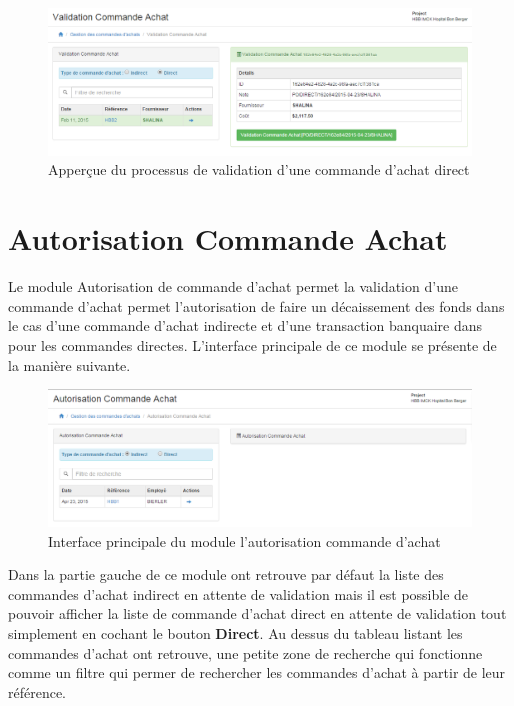 \documentclass[12pt,a4paper]{report}
\begin{document}
\begin{figure}[h]
\begin{center}
\includegraphics[width=12cm]{pic/ValidAchatDirect.png}
\end{center}
\caption{Apperçue du processus de validation d'une commande d'achat direct}
\label{Apperçue du processus de validation d'une commande d'achat direct}
\end{figure} 

\newpage
\newpage
\section{Autorisation Commande Achat}
Le module Autorisation de commande d'achat permet la validation d'une commande d'achat permet l'autorisation de faire un décaissement des fonds dans le cas d'une commande d'achat indirecte et d'une transaction banquaire dans pour les commandes directes. L'interface principale de ce module se présente de la manière suivante.

\begin{figure}[h]
\begin{center}
\includegraphics[width=12cm]{pic/AutorisAchat.png}
\end{center}
\caption{Interface principale du module l'autorisation commande d'achat}
\label{Interface principale du module l'autorisation commande d'achat}
\end{figure}  

Dans la partie gauche de ce module ont retrouve par défaut la liste des commandes d'achat indirect en attente de validation mais il est possible de pouvoir afficher la liste de commande d'achat direct en attente de validation tout simplement en cochant le bouton \textbf{Direct}. Au dessus du tableau listant les commandes d'achat ont retrouve, une petite zone de recherche qui fonctionne comme un filtre qui permer de rechercher les commandes d'achat à partir de leur référence.
\end{document}
